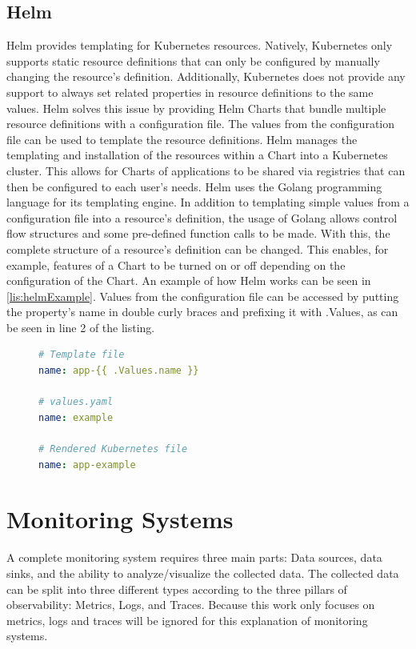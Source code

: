 \subsection*{Helm}

Helm \cite{HEL-DOCS} provides templating for Kubernetes resources.
Natively, Kubernetes only supports static resource definitions that can only
be configured by manually changing the resource's definition. Additionally,
Kubernetes does not provide any support to always set related properties
in resource definitions to the same values. Helm solves this issue
by providing Helm Charts that bundle multiple resource definitions
with a configuration file. The values from the configuration file
can be used to template the resource definitions. Helm manages the templating and
installation of the resources within a Chart into a Kubernetes cluster. This allows
for Charts of applications to be shared via registries that can then be configured to
each user's needs. Helm uses the Golang programming language
for its templating engine. In addition to templating simple values from a configuration file
into a resource's definition, the usage of Golang allows control flow structures and
some pre-defined function calls to be made. With this, the complete structure of a resource's
definition can be changed. This enables, for example, features of a Chart to be turned on or off
depending on the configuration of the Chart.
An example of how Helm works can be seen in \autoref{lis:helmExample}.
Values from the configuration file can be accessed by putting the property's name in double curly braces and prefixing it with .Values,
as can be seen in line 2 of the listing.

\begin{figure}[tb]
\begin{lstlisting}[caption = {Helm Templating Example}, label = {lis:helmExample}, style = kit-cm, language=yaml]
# Template file
name: app-{{ .Values.name }}

# values.yaml
name: example

# Rendered Kubernetes file
name: app-example
\end{lstlisting}
\end{figure}

\section{Monitoring Systems}
\label{sec:tech_monitoring_systems}

A complete monitoring system requires three main parts: Data sources, data sinks, and the ability
to analyze/visualize the collected data.
The collected data can be split into three different types
according to the three pillars of observability: Metrics, Logs, and Traces.
Because this work only focuses on metrics, logs and traces will be ignored for this explanation of monitoring systems.

